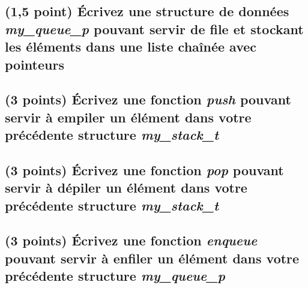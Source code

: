 \documentclass[11pt,a4paper]{article}
\begin{document}
\bigskip

\begin{center}
\end{center}

\bigskip

\subsection{(1,5 point) \'Ecrivez une structure de données \og \textit{my\_queue\_p} \fg{} pouvant servir de file et stockant les éléments dans une liste chaînée avec pointeurs }

\bigskip

\begin{center}
\end{center}



\newpage

\subsection{(3 points) \'Ecrivez une fonction \og \textit{push} \fg{} pouvant servir à empiler un élément dans votre précédente structure \og \textit{my\_stack\_t} \fg{} }

\bigskip

\begin{center}

\end{center}

\newpage

\subsection{(3 points) \'Ecrivez une fonction \og \textit{pop} \fg{} pouvant servir à dépiler un élément dans votre précédente structure \og \textit{my\_stack\_t} \fg{} }

\bigskip

\begin{center}
\end{center}

\bigskip



\newpage

\subsection{(3 points) \'Ecrivez une fonction \og \textit{enqueue} \fg{} pouvant servir à enfiler un élément dans votre précédente structure \og \textit{my\_queue\_p} \fg{} }
\end{document}
